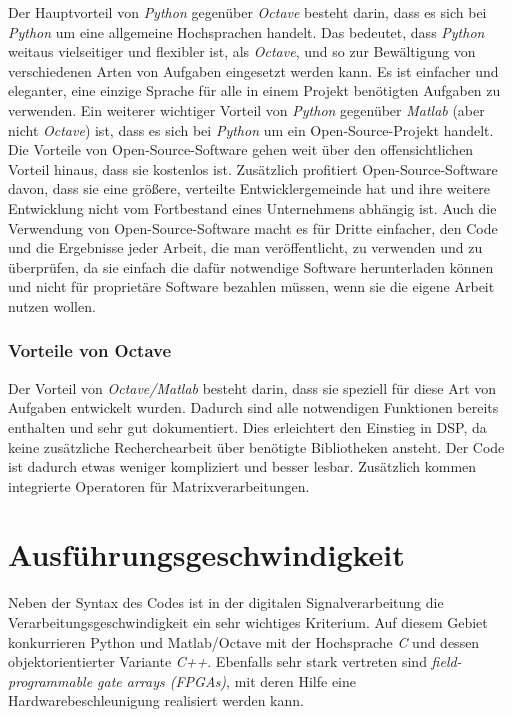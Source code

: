 \documentclass[11pt]{article}
\begin{document}
Der Hauptvorteil von \emph{Python} gegenüber \emph{Octave} besteht
darin, dass es sich bei \emph{Python} um eine allgemeine Hochsprachen
handelt. Das bedeutet, dass \emph{Python} weitaus vielseitiger und
flexibler ist, als \emph{Octave}, und so zur Bewältigung von
verschiedenen Arten von Aufgaben eingesetzt werden kann. Es ist
einfacher und eleganter, eine einzige Sprache für alle in einem Projekt
benötigten Aufgaben zu verwenden. Ein weiterer wichtiger Vorteil von
\emph{Python} gegenüber \emph{Matlab} (aber nicht \emph{Octave}) ist,
dass es sich bei \emph{Python} um ein Open-Source-Projekt handelt. Die
Vorteile von Open-Source-Software gehen weit über den offensichtlichen
Vorteil hinaus, dass sie kostenlos ist. Zusätzlich profitiert
Open-Source-Software davon, dass sie eine größere, verteilte
Entwicklergemeinde hat und ihre weitere Entwicklung nicht vom
Fortbestand eines Unternehmens abhängig ist. Auch die Verwendung von
Open-Source-Software macht es für Dritte einfacher, den Code und die
Ergebnisse jeder Arbeit, die man veröffentlicht, zu verwenden und zu
überprüfen, da sie einfach die dafür notwendige Software herunterladen
können und nicht für proprietäre Software bezahlen müssen, wenn sie die
eigene Arbeit nutzen wollen.

\hypertarget{vorteile-von-octave}{%
\subsubsection{Vorteile von Octave}\label{vorteile-von-octave}}

Der Vorteil von \emph{Octave/Matlab} besteht darin, dass sie speziell
für diese Art von Aufgaben entwickelt wurden. Dadurch sind alle
notwendigen Funktionen bereits enthalten und sehr gut dokumentiert. Dies
erleichtert den Einstieg in DSP, da keine zusätzliche Recherchearbeit
über benötigte Bibliotheken ansteht. Der Code ist dadurch etwas weniger
kompliziert und besser lesbar. Zusätzlich kommen integrierte Operatoren
für Matrixverarbeitungen.

    \hypertarget{ausfuxfchrungsgeschwindigkeit}{%
\section{Ausführungsgeschwindigkeit}\label{ausfuxfchrungsgeschwindigkeit}}

Neben der Syntax des Codes ist in der digitalen Signalverarbeitung die
Verarbeitungsgeschwindigkeit ein sehr wichtiges Kriterium. Auf diesem
Gebiet konkurrieren Python und Matlab/Octave mit der Hochsprache
\emph{C} und dessen objektorientierter Variante \emph{C++}. Ebenfalls
sehr stark vertreten sind \emph{field-programmable gate arrays (FPGAs)},
mit deren Hilfe eine Hardwarebeschleunigung realisiert werden kann.
\end{document}
